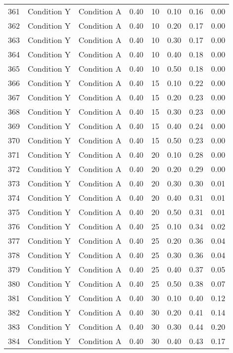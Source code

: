 \begin{landscape}
\begin{longtable}{cc cc cc cc}
  361 & Condition Y & Condition A & 0.40 &  10 & 0.10 & 0.16 & 0.00 \\ 
  362 & Condition Y & Condition A & 0.40 &  10 & 0.20 & 0.17 & 0.00 \\ 
  363 & Condition Y & Condition A & 0.40 &  10 & 0.30 & 0.17 & 0.00 \\ 
  364 & Condition Y & Condition A & 0.40 &  10 & 0.40 & 0.18 & 0.00 \\ 
  365 & Condition Y & Condition A & 0.40 &  10 & 0.50 & 0.18 & 0.00 \\ 
  366 & Condition Y & Condition A & 0.40 &  15 & 0.10 & 0.22 & 0.00 \\ 
  367 & Condition Y & Condition A & 0.40 &  15 & 0.20 & 0.23 & 0.00 \\ 
  368 & Condition Y & Condition A & 0.40 &  15 & 0.30 & 0.23 & 0.00 \\ 
  369 & Condition Y & Condition A & 0.40 &  15 & 0.40 & 0.24 & 0.00 \\ 
  370 & Condition Y & Condition A & 0.40 &  15 & 0.50 & 0.23 & 0.00 \\ 
  371 & Condition Y & Condition A & 0.40 &  20 & 0.10 & 0.28 & 0.00 \\ 
  372 & Condition Y & Condition A & 0.40 &  20 & 0.20 & 0.29 & 0.00 \\ 
  373 & Condition Y & Condition A & 0.40 &  20 & 0.30 & 0.30 & 0.01 \\ 
  374 & Condition Y & Condition A & 0.40 &  20 & 0.40 & 0.31 & 0.01 \\ 
  375 & Condition Y & Condition A & 0.40 &  20 & 0.50 & 0.31 & 0.01 \\ 
  376 & Condition Y & Condition A & 0.40 &  25 & 0.10 & 0.34 & 0.02 \\ 
  377 & Condition Y & Condition A & 0.40 &  25 & 0.20 & 0.36 & 0.04 \\ 
  378 & Condition Y & Condition A & 0.40 &  25 & 0.30 & 0.36 & 0.04 \\ 
  379 & Condition Y & Condition A & 0.40 &  25 & 0.40 & 0.37 & 0.05 \\ 
  380 & Condition Y & Condition A & 0.40 &  25 & 0.50 & 0.38 & 0.07 \\ 
  381 & Condition Y & Condition A & 0.40 &  30 & 0.10 & 0.40 & 0.12 \\ 
  382 & Condition Y & Condition A & 0.40 &  30 & 0.20 & 0.41 & 0.14 \\ 
  383 & Condition Y & Condition A & 0.40 &  30 & 0.30 & 0.44 & 0.20 \\ 
  384 & Condition Y & Condition A & 0.40 &  30 & 0.40 & 0.43 & 0.17 \\ 

\end{longtable}
\end{landscape}
